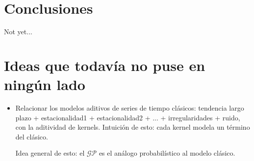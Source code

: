 \documentclass[a4paper]{article}
\newcommand{\gp}{\ensuremath{\mathcal{GP}}}
\begin{document}
\section{Conclusiones}
Not yet...


\section*{Ideas que todavía no puse en ningún lado}
\begin{itemize}
	\item Relacionar los modelos aditivos de series de tiempo clásicos: tendencia largo plazo + estacionalidad1 + estacionalidad2 + ... + irregularidades + ruido, con la aditividad de kernels. Intuición de esto: cada kernel modela un término del clásico.
	
	Idea general de esto: el $\gp$ es el análogo probabilístico al modelo clásico.
\end{itemize}
\end{document}
